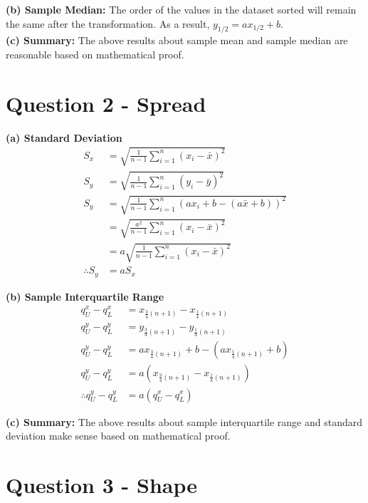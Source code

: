 \documentclass[
]{book}
\begin{document}
\textbf{(b) Sample Median: } The order of the values in the dataset sorted will remain the same after the transformation. As a result, \(y_{1/2} = ax_{1/2} + b\).\\
\textbf{(c) Summary: } The above results about sample mean and sample median are reasonable based on mathematical proof.

\section{Question 2 - Spread}\label{question-2---spread}

\textbf{(a) Standard Deviation}
\[\begin{aligned}
S_x &= \sqrt{\frac{1}{n-1} \sum_{i=1}^{n} (x_i - \bar{x})^2} \\
S_y &= \sqrt{\frac{1}{n-1} \sum_{i=1}^{n} (y_i - \bar{y})^2} \\
S_y &= \sqrt{\frac{1}{n-1} \sum_{i=1}^{n} (ax_i + b - (a\bar{x} + b))^2} \\
    &= \sqrt{\frac{a^2}{n-1} \sum_{i=1}^{n} (x_i - \bar{x})^2} \\
    &= a \sqrt{\frac{1}{n-1} \sum_{i=1}^{n} (x_i - \bar{x})^2} \\
\therefore S_y &= a S_x 
\end{aligned}\]

\textbf{(b) Sample Interquartile Range}
\[\begin{aligned} 
q_U^x - q_L^x &= x_{\frac{3}{4}(n+1)} - x_{\frac{1}{4}(n+1)} \\
q_U^y - q_L^y &= y_{\frac{3}{4}(n+1)} - y_{\frac{1}{4}(n+1)} \\
q_U^y - q_L^y &= ax_{\frac{3}{4}(n+1)} + b - (ax_{\frac{1}{4}(n+1)} + b) \\
q_U^y - q_L^y &= a(x_{\frac{3}{4}(n+1)} - x_{\frac{1}{4}(n+1)}) \\
\therefore q_U^y - q_L^y &= a(q_U^x - q_L^x)
\end{aligned}\]

\textbf{(c) Summary: } The above results about sample interquartile range and standard deviation make sense based on mathematical proof.

\section{Question 3 - Shape}\label{question-3---shape}
\end{document}
